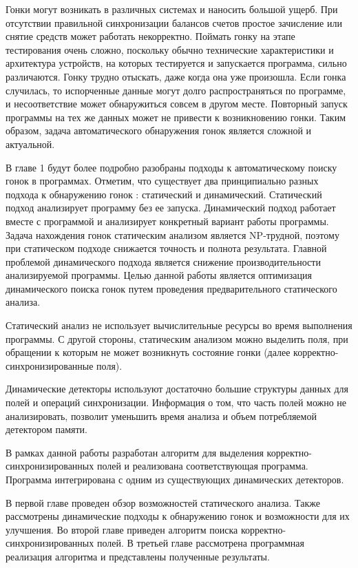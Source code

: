 Гонки могут возникать в различных системах и наносить большой ущерб. При отсутствии правильной синхронизации балансов счетов простое зачисление или снятие средств может работать некорректно. Поймать гонку на этапе тестирования очень сложно, поскольку обычно технические характеристики и архитектура устройств, на которых тестируется и запускается программа, сильно различаются. Гонку трудно отыскать, даже когда она уже произошла. Если гонка случилась, то испорченные данные могут долго распространяться по программе, и несоответствие может обнаружиться совсем в другом месте. Повторный запуск программы на тех же данных может не привести к возникновению гонки. Таким образом, задача автоматического обнаружения гонок является
сложной и актуальной.

В главе 1 будут более подробно разобраны подходы к автоматическому поиску гонок в программах. Отметим, что существует два принципиально разных подхода к обнаружению гонок : статический и динамический. Статический подход  анализирует программу без ее запуска. Динамический подход работает вместе с программой и анализирует конкретный вариант работы программы. Задача нахождения гонок статическим анализом является NP-трудной, поэтому при статическом подходе снижается точность и полнота результата. Главной проблемой динамического подхода является снижение производительности анализируемой программы. Целью данной работы является оптимизация динамического поиска гонок путем проведения предварительного статического анализа. 

Статический анализ не использует вычислительные ресурсы во время выполнения программы. С другой стороны, статическим анализом можно выделить поля, при обращении к которым не может возникнуть состояние гонки (далее корректно-синхронизированные поля).

Динамические детекторы используют достаточно большие структуры данных для полей и операций синхронизации. Информация о том, что часть полей можно не анализировать, позволит уменьшить время анализа и объем потребляемой детектором памяти.

В рамках данной работы разработан алгоритм для выделения корректно-синхронизированных полей и реализована соответствующая программа. Программа интегрирована с одним из существующих динамических детекторов.

В первой главе проведен обзор возможностей статического анализа. Также рассмотрены динамические подходы к обнаружению гонок и возможности для их улучшения. Во второй главе приведен алгоритм поиска корректно-синхронизированных полей. В третьей главе рассмотрена программная реализация алгоритма и представлены полученные результаты.
\FloatBarrier
